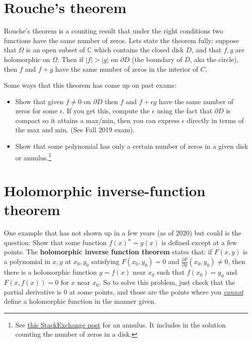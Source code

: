 \documentclass[10pt]{article}
\begin{document}
\section{Rouche's theorem}

Rouche's theorem is a counting result that under the right conditions two functions have the same number of zeros.
Lets state the theorem fully:
suppose that $\Omega$ is an open subset of $\mathbb{C}$ which contains the closed disk $D$, and that $f,g$ 
are holomorphic on $\Omega$.
Then if $|f| > |g|$ on $\partial D$ (the boundary of $D$, aka the circle), then $f$ and $f+g$ have the same number of zeros 
in the interior of $C$.

Some ways that this theorem has come up on past exams:
\begin{itemize}
	\item Show that given $f\neq 0$ on $\partial D$ then $f$ and $f+\epsilon g$ have the same number of zeros for some $\epsilon$. 
	If you get this, compute the $\epsilon$ using the fact that $\partial D$ is compact so it attains a max/min, then you can express 
	$\epsilon$ directly in terms of the max and min. (See Fall 2019 exam).
	
	\item Show that some polynomial has only a certain number of zeros in a given disk or annulus.\footnote{See 
	\href{https://math.stackexchange.com/questions/1272007/find-the-number-of-roots-of-a-polynomial-using-rouches-theorem}{this StackExchange post} 
	for an annulus. It includes in the solution counting the number of zeros in a disk.}
	
\end{itemize}

\section{Holomorphic inverse-function theorem}

One example that has not shown up in a few years (as of 2020) but could is the question:
Show that some function $f(x)^n = g(x)$ is defined except at a few points. The \textbf{holomorphic inverse function theorem}
states that: if $F(x,y)$ is a polynomial in $x,y$ at $x_0, y_0$ satisfying $F(x_0, y_0) = 0$ and $\frac{\partial F}{\partial y}(x_0,y_0) \neq 0$,
then there is a holomorphic function $y = f(x)$ near $x_0$ such that $f(x_0) = y_0$ and $F(x, f(x)) = 0$ for $x$ near $x_0$.
So to solve this problem, just check that the partial derivative is $0$ at some points, and those are the points where you \emph{\underline{cannot}}
define a holomorphic function in the manner given.
\end{document}

